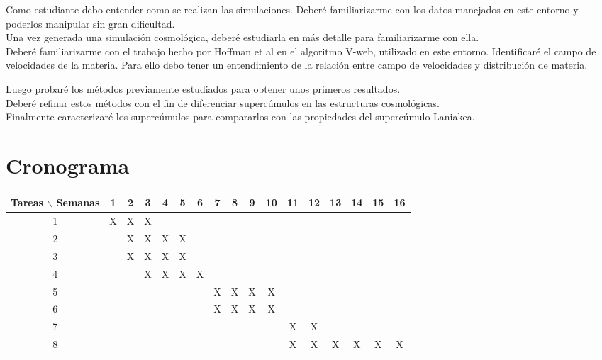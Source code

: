 \documentclass[12pt]{article}
\begin{document}
Como estudiante debo entender como se realizan las
simulaciones. Deber\'{e} familiarizarme con los datos manejados en
este entorno y poderlos manipular sin gran dificultad.
\\

Una vez generada una simulaci\'on cosmol\'{o}gica, 
deber\'{e} estudiarla en m\'{a}s detalle para familiarizarme con
ella.
\\
Deber\'{e} familiarizarme con el trabajo hecho por Hoffman et al\cite{hoffman_kinematic_2012} en el algoritmo V-web, utilizado en este entorno. Identificar\'{e} el campo de velocidades de la materia. Para ello debo tener un entendimiento de la relaci\'{o}n entre campo de velocidades  y distribuci\'{o}n de materia. 

Luego probar\'{e} los m\'{e}todos previamente estudiados para obtener unos
primeros resultados.  
\\

Deber\'{e} refinar estos m\'{e}todos con el fin de diferenciar
superc\'{u}mulos en las estructuras cosmol\'{o}gicas. 
\\

Finalmente caracterizar\'{e} los superc\'umulos para compararlos con las
propiedades del superc\'umulo Laniakea.

\section{Cronograma}

\begin{table}[htb]
	\begin{tabular}{|c|cccccccccccccccc| }
	\hline
	Tareas $\backslash$ Semanas & 1 & 2 & 3 & 4 & 5 & 6 & 7 & 8 & 9 & 10 & 11 & 12 & 13 & 14 & 15 & 16  \\
	\hline
	1 & X & X & X &   &   &   &   &   &   &   &   &   &   &   &   &   \\
	2 &   & X & X & X & X &   &   &   &   &   &   &   &   &   &   &   \\
	3 &   & X & X & X & X &   &   &   &   &   &   &   &   &   &   &   \\
	4 &   &   & X & X & X & X &   &   &   &   &   &   &   &   &   &   \\
	5 &   &   &   &   &   &   & X & X & X & X &   &   &   &   &   &   \\
	6 &   &   &   &   &   &   & X & X & X & X &   &   &   &   &   &   \\
	7 &   &   &   &   &   &   &   &   &   &   & X & X &   &   &   &   \\
	8 &   &   &   &   &   &   &   &   &   &   & X & X & X & X & X & X \\
	\hline
	\end{tabular}
\end{table}
\vspace{1mm}
\FloatBarrier
\end{document}
